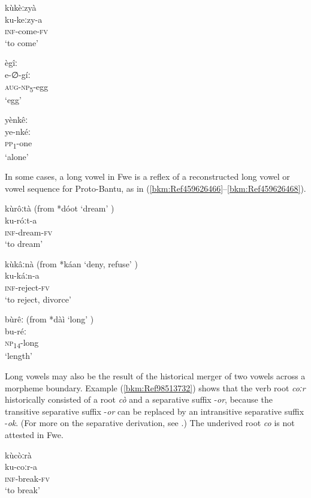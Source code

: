 \ea
\glll kùkèːzyà\\
ku-keːzy-a\\
\textsc{inf}-come-\textsc{fv}\\
\glt ‘to come’
\z

\ea
\label{bkm:Ref459125519}
\glll ègîː\\
e-∅-gíː\\
\textsc{aug}-\textsc{np}\textsubscript{5}-egg\\
\glt ‘egg’
\z

\ea
\label{bkm:Ref497906688}
\glll yènkêː\\
ye-nkéː\\
\textsc{pp}\textsubscript{1}-one\\
\glt ‘alone’
\z

In some cases, a long vowel in Fwe is a reflex of a reconstructed long vowel or vowel sequence for Proto-Bantu, as in (\ref{bkm:Ref459626466}--\ref{bkm:Ref459626468}).

\ea
\label{bkm:Ref459626466}
kùrôːtà (from *dóot ‘dream’ \citep{BastinEtAl2002})\\
ku-róːt-a\\
\textsc{inf}-dream-\textsc{fv}\\
\glt ‘to dream’
\z

\ea
kùkâːnà (from *káan ‘deny, refuse’ \citep{BastinEtAl2002})\\
ku-káːn-a\\
\textsc{inf}-reject-\textsc{fv}\\
\glt ‘to reject, divorce’
\z

\ea
\label{bkm:Ref459626468}
bùrêː (from *dàì ‘long’ \citep{BastinEtAl2002})\\
bu-réː\\
\textsc{np}\textsubscript{14}-long\\
\glt ‘length’
\z

Long vowels may also be the result of the historical merger of two vowels across a morpheme boundary. Example (\ref{bkm:Ref98513732}) shows that the verb root \textit{coːr} historically consisted of a root \textit{cò} and a separa\-tive suffix -\textit{or}, because the transitive separative suffix -\textit{or} can be replaced by an intransitive separative suffix -\textit{ok}. (For more on the separative derivation, see .) The underived root \textit{co} is not attested in Fwe.

\ea
\label{bkm:Ref98513732}
\ea
\glll kùcòːrà\\
ku-coːr-a\\
\textsc{inf}-break-\textsc{fv}\\
\glt ‘to break’

